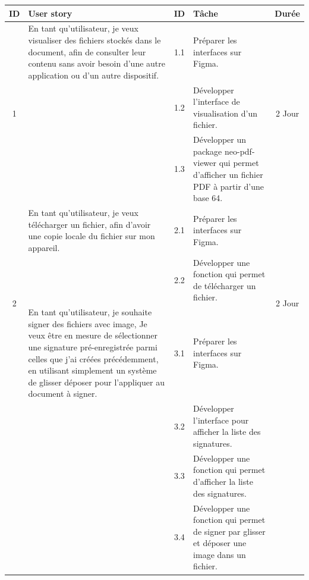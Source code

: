 

\begin{adjustwidth}{-1cm}{}
    
    \begin{longtable}{|c|p{6cm}|c|p{6cm}|c|}
      \hline
      \textbf{ID} & \textbf{User story} & \textbf{ID}  & \textbf{Tâche} & \textbf{Durée} \\
      \hline

      \multirow{3}{*}{1} & En tant qu'utilisateur, je veux
      visualiser des fichiers stockés dans le document, afin de consulter leur contenu sans avoir besoin d'une autre application ou d'un
      autre dispositif. & 1.1 & Préparer les interfaces sur Figma. & \multirow{3}{*}{2 Jour} \\
      \cline{3-4}
      & & 1.2 & Développer l'interface de visualisation d'un fichier. & \\
      \cline{3-4}
      & & 1.3 & Développer un package neo-pdf-viewer qui permet d'afficher un fichier PDF à partir d'une base 64. & \\
      \cline{1-5}

      \multirow{3}{*}{2} & En tant qu'utilisateur, je veux télécharger un fichier, afin d'avoir une copie locale du fichier sur mon appareil. & 2.1 & Préparer les interfaces sur Figma. & \multirow{3}{*}{2 Jour} \\
      \cline{3-4}
      & & 2.2 & Développer une fonction qui permet de télécharger un fichier. & \\
      \cline{1-5}

      \multirow{3}{*}{3} & En tant qu'utilisateur, je souhaite signer des fichiers avec image, Je veux être en mesure de sélectionner une signature pré-enregistrée parmi celles que j'ai créées précédemment, en utilisant simplement un système de glisser déposer pour l'appliquer au document à signer.& 3.1 & Préparer les interfaces sur Figma. & \multirow{3}{*}{2 Jour} \\
      \cline{3-4}
      & & 3.2 & Développer l'interface pour afficher la liste des signatures. & \\
      & & 3.3 & Développer une fonction qui permet d'afficher la liste des signatures. & \\
      & & 3.4 & Développer une fonction qui permet de signer par glisser et déposer une image dans un fichier. & \\
      \cline{1-5}


\end{longtable}
\end{adjustwidth}
